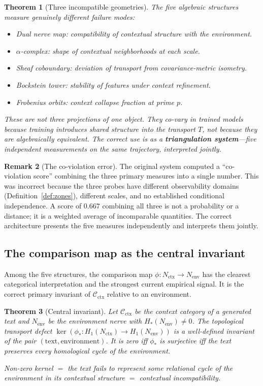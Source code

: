 \documentclass[11pt]{amsart}
\newtheorem{theorem}{Theorem}[section]
\theoremstyle{definition}
\newtheorem{remark}[theorem]{Remark}
\newcommand{\Cctx}{\mathcal{C}_{\!\mathrm{ctx}}}
\newcommand{\Nctx}{N_{\mathrm{ctx}}}
\newcommand{\Nenv}{N_{\mathrm{env}}}
\begin{document}
\begin{theorem}[Three incompatible geometries]
\label{thm:independent}
The five algebraic structures measure genuinely different failure modes:
\begin{itemize}
\item Dual nerve map: compatibility of contextual structure with the environment.
\item $\alpha$-complex: shape of contextual neighborhoods at each scale.
\item Sheaf coboundary: deviation of transport from covariance-metric isometry.
\item Bockstein tower: stability of features under context refinement.
\item Frobenius orbits: context collapse fraction at prime $p$.
\end{itemize}
These are not three projections of one object.
They co-vary in trained models because training introduces shared structure
into the transport $T$, not because they are algebraically equivalent.
The correct use is as a \textbf{triangulation system}---five independent
measurements on the same trajectory, interpreted jointly.
\end{theorem}

\begin{remark}[The co-violation error]
The original system computed a ``co-violation score'' combining the three
primary measures into a single number.
This was incorrect because the three probes have different observability
domains (Definition~\ref{def:zones}), different scales, and no established
conditional independence.
A score of $0.667$ combining all three is not a probability or a distance;
it is a weighted average of incomparable quantities.
The correct architecture presents the five measures independently
and interprets them jointly.
\end{remark}

\subsection{The comparison map as the central invariant}

Among the five structures, the comparison map $\phi: \Nctx \to \Nenv$
has the clearest categorical interpretation and the strongest
current empirical signal.
It is the correct primary invariant of $\Cctx$ relative to an environment.

\begin{theorem}[Central invariant]
\label{thm:central}
Let $\Cctx$ be the context category of a generated text
and $\Nenv$ be the environment nerve with $H_*(\Nenv) \neq 0$.
The \emph{topological transport defect}
$\ker(\phi_*: H_1(\Nctx) \to H_1(\Nenv))$
is a well-defined invariant of the pair $(\text{text}, \text{environment})$.
It is zero iff $\phi_*$ is surjective iff the text preserves
every homological cycle of the environment.

Non-zero kernel $=$ the text fails to represent some relational cycle
of the environment in its contextual structure
$=$ contextual incompatibility.
\end{theorem}
\end{document}
